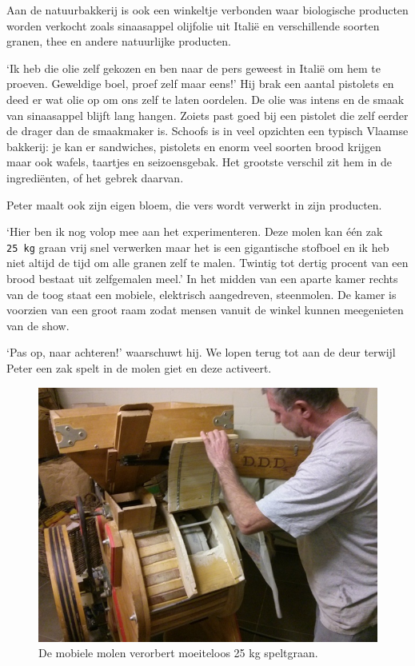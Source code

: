 \documentclass[
  11pt,
  dutch,
]{memoir}
\begin{document}
Aan de natuurbakkerij is ook een winkeltje verbonden waar biologische
producten worden verkocht zoals sinaasappel olijfolie uit Italië en
verschillende soorten granen, thee en andere natuurlijke producten.

`Ik heb die olie zelf gekozen en ben naar de pers geweest in Italië om
hem te proeven. Geweldige boel, proef zelf maar eens!' Hij brak een
aantal pistolets en deed er wat olie op om ons zelf te laten oordelen.
De olie was intens en de smaak van sinaasappel blijft lang hangen.
Zoiets past goed bij een pistolet die zelf eerder de drager dan de
smaakmaker is. Schoofs is in veel opzichten een typisch Vlaamse
bakkerij: je kan er sandwiches, pistolets en enorm veel soorten brood
krijgen maar ook wafels, taartjes en seizoensgebak. Het grootste
verschil zit hem in de ingrediënten, of het gebrek daarvan.

Peter maalt ook zijn eigen bloem, die vers wordt verwerkt in zijn
producten.

`Hier ben ik nog volop mee aan het experimenteren. Deze molen kan één
zak \texttt{25\ kg} graan vrij snel verwerken maar het is een
gigantische stofboel en ik heb niet altijd de tijd om alle granen zelf
te malen. Twintig tot dertig procent van een brood bestaat uit
zelfgemalen meel.' In het midden van een aparte kamer rechts van de toog
staat een mobiele, elektrisch aangedreven, steenmolen. De kamer is
voorzien van een groot raam zodat mensen vanuit de winkel kunnen
meegenieten van de show.

`Pas op, naar achteren!' waarschuwt hij. We lopen terug tot aan de deur
terwijl Peter een zak spelt in de molen giet en deze activeert.

\begin{figure}
\centering
\includegraphics{img/bw/peter2.jpg}
\caption[De mobiele bloemmolen van Peter Schoofs.]{De mobiele molen verorbert moeiteloos 25 kg speltgraan.}
\end{figure}
\end{document}
